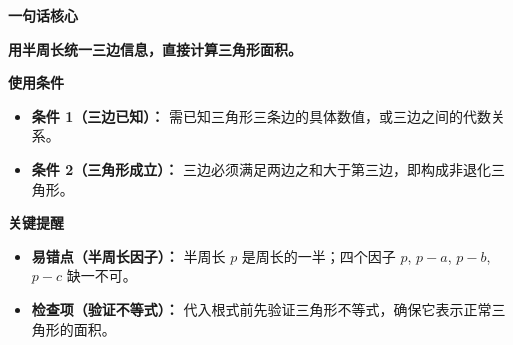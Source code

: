 \begin{summarybox}
	\textbf{\textcolor{CSummary}{一句话核心}}

	\textbf{用半周长统一三边信息，直接计算三角形面积。}

	\medskip
	\textbf{\textcolor{CSummary}{使用条件}}

	\begin{itemize}[leftmargin=*, itemsep=0.5em, topsep=0.4em]
		\item \textbf{条件 1（三边已知）：} 需已知三角形三条边的具体数值，或三边之间的代数关系。
		\item \textbf{条件 2（三角形成立）：} 三边必须满足两边之和大于第三边，即构成非退化三角形。
	\end{itemize}

	\medskip
	\textbf{\textcolor{CSummary}{关键提醒}}

	\begin{itemize}[leftmargin=*, itemsep=0.5em, topsep=0.4em]
		\item \textbf{易错点（半周长因子）：} 半周长 $p$ 是周长的一半；四个因子 $p$, $p-a$, $p-b$, $p-c$ 缺一不可。
		\item \textbf{检查项（验证不等式）：} 代入根式前先验证三角形不等式，确保它表示正常三角形的面积。
	\end{itemize}
\end{summarybox}